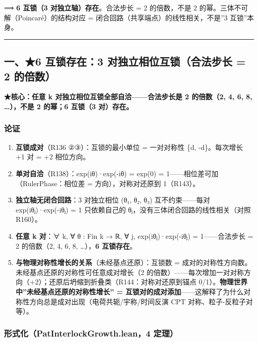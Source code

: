 \documentclass[
]{article}
\providecommand{\tightlist}{%
 \setlength{\itemsep}{0pt}\setlength{\parskip}{0pt}}
\begin{document}
⟹ \textbf{6 互锁（3 对独立轴）存在}。合法步长 = 2 的倍数，不是 2
的幂。三体不可解（Poincaré）的结构对应 =
闭合回路（共享端点）的线性相关，不是''3 互锁''本身。

\begin{center}\rule{0.5\linewidth}{0.5pt}\end{center}

\subsection{一、★6 互锁存在：3 对独立相位互锁（合法步长 = 2
的倍数）}\label{ux4e006-ux4e92ux9501ux5b58ux57283-ux5bf9ux72ecux7acbux76f8ux4f4dux4e92ux9501ux5408ux6cd5ux6b65ux957f-2-ux7684ux500dux6570}

\textbf{★核心：任意 k 对独立相位互锁全部自洽------合法步长是 2
的倍数（2, 4, 6, 8, \ldots），不是 2 的幂；6 互锁（3 对）存在。}

\subsubsection{论证}\label{ux8bbaux8bc1}

\begin{enumerate}
\def\labelenumi{\arabic{enumi}.}
\tightlist
\item
 \textbf{互锁成对}（R136 ②③）：互锁的最小单位 = 一对对称性 \{d,
 -d\}。每次增长 +1 对 = +2 相位方向。
\item
 \textbf{单对自洽}（R138）：exp(iθ)·exp(-iθ) = exp(0) =
 1------相位差可加（RulerPhase：相位差 = 方向），对称对还原到
 1（R143）。
\item
 \textbf{独立轴无闭合回路}：3 对独立相位 (θ₁, θ₂, θ₃)
 互不约束------每对 exp(iθⱼ)·exp(-iθⱼ) = 1 只依赖自己的
 θⱼ，没有三体闭合回路的线性相关（对照 R160）。
\item
 \textbf{任意 k 对}：∀ k, ∀ θ : Fin k → ℝ, ∀ j, exp(iθⱼ)·exp(-iθⱼ) =
 1------合法步长 = 2 的倍数（2, 4, 6, 8, \ldots），\textbf{6
 互锁存在}。
\item
 \textbf{与物理对称性增长的关系}（未经基点还原）：互锁数 =
 成对的对称性方向数。未经基点还原的对称性可任意成对增长（2
 的倍数）------每次增加一对对称方向（+2）；还原后坍缩到折叠类（R144：对称对还原到锚点
 0/1）。\textbf{物理世界中''未经基点还原的对称性增长'' =
 互锁对的成对添加}------这解释了为什么对称性方向总是成对出现（电荷共轭/宇称/时间反演
 CPT 对称、粒子-反粒子对等）。
\end{enumerate}

\subsubsection{形式化（PatInterlockGrowth.lean，4
定理）}\label{ux5f62ux5f0fux5316patinterlockgrowth.lean4-ux5b9aux7406}
\end{document}
